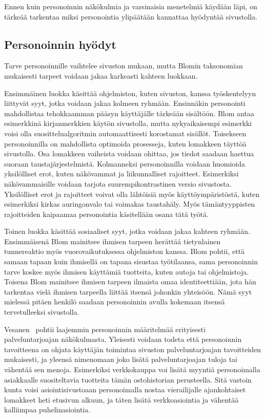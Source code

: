 \documentclass[finnish, 12pt, a4paper, elec, utf8, a-1b, online]{aaltothesis}
\begin{document}
Ennen kuin personoinnin näkökulmia ja varsinaisia menetelmiä käydään läpi, on
tärkeää tarkentaa miksi personointia ylipäätään kannattaa hyödyntää
sivustolla.

\subsection{Personoinnin hyödyt}

Tarve personoinnille vaihtelee sivuston mukaan, mutta Blomin taksonomian
mukaisesti tarpeet voidaan jakaa karkeasti kahteen luokkaan.

Ensimmäinen luokka käsittää ohjelmiston, kuten sivuston, kanssa työskentelyyn
liittyvät syyt, jotka voidaan jakaa kolmeen ryhmään. Ensinnäkin personointi
mahdollistaa tehokkaamman pääsyn käyttäjälle tärkeään sisältöön. Blom antaa
esimerkkinä kirjanmerkkien käytön sivustolla, mutta nykyaikaisempi esimerkki
voisi olla suosittelualgoritmin automaattisesti korostamat sisällöt. Toisekseen
personoinnilla on mahdollista optimoida prosesseja, kuten lomakkeen täyttöä
sivustolla. Osa lomakkeen vaiheista voidaan ohittaa, jos tiedot saadaan haettua
suoraan taustajärjestelmistä. Kolmanneksi personoinnilla voidaan huomioida
yksilölliset erot, kuten näkövammat ja liikunnalliset rajoitteet. Esimerkiksi
näkövammaisille voidaan tarjota suurempikontrastinen versio sivustosta.
Yksilölliset erot ja rajoitteet voivat olla lähtöisiä myös käyttöympäristöstä,
kuten esimerkiksi kirkas auringonvalo tai voimakas taustahäly. Myös
tämäntyyppisten rajoitteiden kaipaamaa personointia käsitellään osana tätä
työtä.

Toinen luokka käsittää sosiaaliset syyt, jotka voidaan jakaa kahteen ryhmään.
Ensimmäisenä Blom mainitsee ihmisen tarpeen herättää tietynlainen tunnereaktio
myös vuorovaikutuksessa ohjelmiston kanssa. Blom pohtii, että samaan tapaan kuin
ihmisellä on tapana sisustaa työtilaansa, sama personoinnin tarve koskee myös
ihmisen käyttämiä tuotteita, kuten autoja tai ohjelmistoja. Toisena Blom
mainitsee ihmisen tarpeen ilmaista omaa identiteettiään, jota hän tarkentaa
vielä ihmisen tarpeella liittää itsensä johonkin yhteisöön. Nämä syyt mielessä
pitäen henkilö saadaan personoinnin avulla kokemaan itsensä tervetulleeksi
sivustolla.

Vesanen~\cite{10.1108/03090560710737534} pohtii laajemmin personoinnin
määritelmää erityisesti palveluntarjoajan näkökulmasta. Yleisesti voidaan todeta
että personoinnin tavoitteena on ohjata käyttäjän toimintaa sivuston
palveluntarjoajan tavoitteiden mukaisesti, ja yleensä nimenomaan joko lisätä
palveluntarjoajan tuloja tai vähentää sen menoja. Esimerkiksi verkkokauppa voi
lisätä myyntiä personoimalla asiakkaalle suositeltavia tuotteita tämän
ostohistorian perusteella. Sitä vastoin kunta voisi asiointisivustoaan
personoimalla nostaa vierailijalle ajankohtaiset lomakkeet heti etusivun alkuun,
ja täten lisätä verkkoasiointia ja vähentää kalliimpaa puhelinasiointia.
\end{document}
